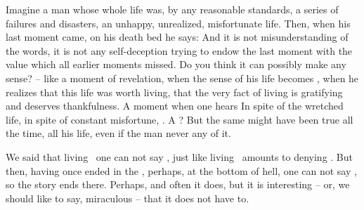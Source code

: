 Imagine a man whose whole life was, by any reasonable standards, a series of
failures and disasters, an unhappy, unrealized, misfortunate life.  Then, when
his last moment came, on his death bed he says:  And it is not misunderstanding of the words, it is not any
self-deception trying to endow the last moment with the value which all earlier
moments missed.  Do you think it can possibly make any sense? 
-- like a moment of {revelation}, when the  sense of his life
becomes , when he realizes that this life was worth living, that
the very fact of living is gratifying and deserves thankfulness.  A moment when
one hears  In spite of the wretched life, in spite of constant
misfortune, . A ? But the same might have been true all the time, all his life, even if
the man never  any  of it.


\pa
We said that living \No\ one can not say \yes, just like living \yes\ amounts to
denying \No. But then, having once ended in the \No, perhaps, at the bottom of
hell, one can not say \Yes, so the story ends there. Perhaps, and often it does, but
it is interesting -- or, we should like to say, miraculous -- that it does not have to. 

